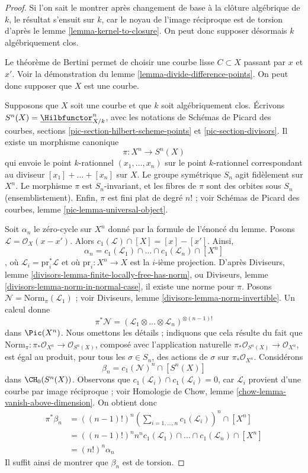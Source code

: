 \begin{proof}
Si l'on sait le montrer après changement de base à la clôture algébrique de $k$,
le résultat s'ensuit sur $k$, car le noyau de l'image réciproque
est de torsion d'après le lemme \ref{lemma-kernel-to-closure}.
On peut donc supposer désormais $k$ algébriquement clos.

\medskip\noindent
Le théorème de Bertini permet de choisir une courbe lisse $C \subset X$ passant par
$x$ et $x'$. Voir la démonstration du lemme \ref{lemma-divide-difference-points}.
On peut donc supposer que $X$ est une courbe.

\medskip\noindent
Supposons que $X$ soit une courbe et que $k$ soit algébriquement clos.
Écrivons $S^n(X) = \underline{\Hilbfunctor}^n_{X/k}$, avec les notations de
Schémas de Picard des courbes, sections \ref{pic-section-hilbert-scheme-points}
et \ref{pic-section-divisors}. Il existe un morphisme canonique
$$
\pi : X^n \longrightarrow S^n(X)
$$
qui envoie le point $k$-rationnel $(x_1, \ldots, x_n)$ sur le point $k$-rationnel
correspondant au diviseur $[x_1] + \ldots + [x_n]$ sur $X$.
Le groupe symétrique $S_n$ agit fidèlement sur $X^n$.
Le morphisme $\pi$ est $S_n$-invariant, et les fibres de $\pi$ sont
des orbites sous $S_n$ (ensemblistement). Enfin, $\pi$ est fini plat de
degré $n!$ ; voir Schémas de Picard des courbes, lemme
\ref{pic-lemma-universal-object}.

\medskip\noindent
Soit $\alpha_n$ le zéro-cycle sur $X^n$ donné par la formule de
l'énoncé du lemme. Posons $\mathcal{L} = \mathcal{O}_X(x - x')$. Alors
$c_1(\mathcal{L}) \cap [X] = [x] - [x']$. Ainsi,
$$
\alpha_n = c_1(\mathcal{L}_1) \cap \ldots \cap c_1(\mathcal{L}_n) \cap [X^n]
$$,
où $\mathcal{L}_i = \text{pr}_i^*\mathcal{L}$ et où $\text{pr}_i : X^n \to X$
est la $i$-ième projection. D'après
Diviseurs, lemme \ref{divisors-lemma-finite-locally-free-has-norm}, ou
Diviseurs, lemme \ref{divisors-lemma-norm-in-normal-case},
il existe une norme pour $\pi$. Posons
$\mathcal{N} = \text{Norm}_\pi(\mathcal{L}_1)$ ;
voir Diviseurs, lemme \ref{divisors-lemma-norm-invertible}. Un calcul donne
$$
\pi^*\mathcal{N} =
(\mathcal{L}_1 \otimes \ldots \otimes \mathcal{L}_n)^{\otimes (n - 1)!}
$$
dans $\Pic(X^n)$. Nous omettons les détails ; indiquons que cela résulte
du fait que
$\text{Norm}_\pi : \pi_*\mathcal{O}_{X^n} \to \mathcal{O}_{S^n(X)}$,
composé avec l'application naturelle $\pi_*\mathcal{O}_{S^n(X)} \to \mathcal{O}_{X^n}$,
est égal au produit, pour tous les $\sigma \in S_n$, des actions de
$\sigma$ sur $\pi_*\mathcal{O}_{X^n}$. Considérons
$$
\beta_n = c_1(\mathcal{N})^n \cap [S^n(X)]
$$
dans $\CH_0(S^n(X))$. Observons que
$c_1(\mathcal{L}_i) \cap c_1(\mathcal{L}_i) = 0$,
car $\mathcal{L}_i$ provient d'une courbe par image réciproque ; voir
Homologie de Chow, lemme \ref{chow-lemma-vanish-above-dimension}. On obtient donc
\begin{align*}
\pi^*\beta_n
& =
((n - 1)!)^n
(\sum\nolimits_{i = 1, \ldots, n} c_1(\mathcal{L}_i))^n \cap [X^n] \\
& =
((n - 1)!)^n n^n 
c_1(\mathcal{L}_1) \cap \ldots \cap c_1(\mathcal{L}_n) \cap [X^n] \\
& =
(n!)^n \alpha_n
\end{align*}
Il suffit ainsi de montrer que $\beta_n$ est de torsion.


\end{proof}
